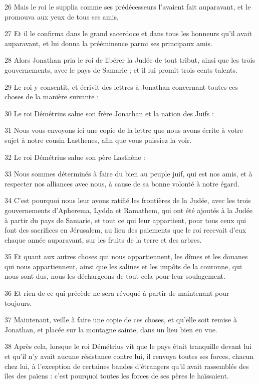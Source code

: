 \par 26 Mais le roi le supplia comme ses prédécesseurs l'avaient fait auparavant, et le promouva aux yeux de tous ses amis,
\par 27 Et il le confirma dans le grand sacerdoce et dans tous les honneurs qu'il avait auparavant, et lui donna la prééminence parmi ses principaux amis.
\par 28 Alors Jonathan pria le roi de libérer la Judée de tout tribut, ainsi que les trois gouvernements, avec le pays de Samarie ; et il lui promit trois cents talents.
\par 29 Le roi y consentit, et écrivit des lettres à Jonathan concernant toutes ces choses de la manière suivante :
\par 30 Le roi Démétrius salue son frère Jonathan et la nation des Juifs :
\par 31 Nous vous envoyons ici une copie de la lettre que nous avons écrite à votre sujet à notre cousin Lasthenes, afin que vous puissiez la voir.
\par 32 Le roi Démétrius salue son père Lasthène :
\par 33 Nous sommes déterminés à faire du bien au peuple juif, qui est nos amis, et à respecter nos alliances avec nous, à cause de sa bonne volonté à notre égard.
\par 34 C'est pourquoi nous leur avons ratifié les frontières de la Judée, avec les trois gouvernements d'Apherema, Lydda et Ramathem, qui ont été ajoutés à la Judée à partir du pays de Samarie, et tout ce qui leur appartient, pour tous ceux qui font des sacrifices en Jérusalem, au lieu des paiements que le roi recevait d'eux chaque année auparavant, sur les fruits de la terre et des arbres.
\par 35 Et quant aux autres choses qui nous appartiennent, les dîmes et les douanes qui nous appartiennent, ainsi que les salines et les impôts de la couronne, qui nous sont dus, nous les déchargeons de tout cela pour leur soulagement.
\par 36 Et rien de ce qui précède ne sera révoqué à partir de maintenant pour toujours.
\par 37 Maintenant, veille à faire une copie de ces choses, et qu'elle soit remise à Jonathan, et placée sur la montagne sainte, dans un lieu bien en vue.
\par 38 Après cela, lorsque le roi Démétrius vit que le pays était tranquille devant lui et qu'il n'y avait aucune résistance contre lui, il renvoya toutes ses forces, chacun chez lui, à l'exception de certaines bandes d'étrangers qu'il avait rassemblés des îles des païens : c'est pourquoi toutes les forces de ses pères le haïssaient.
